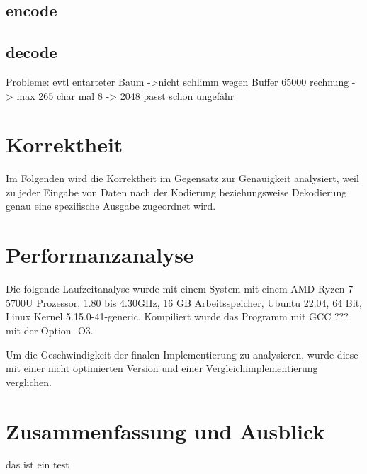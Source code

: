 \documentclass[course=erap]{aspdoc}
\begin{document}
\subsection{encode}
\subsection{decode}

Probleme: evtl entarteter Baum ->nicht schlimm wegen Buffer 65000 rechnung -> max 265 char mal 8 -> 2048 passt schon ungefähr


\section{Korrektheit}

Im Folgenden wird die Korrektheit im Gegensatz zur Genauigkeit analysiert, weil zu jeder Eingabe von Daten nach der Kodierung beziehungsweise Dekodierung genau eine spezifische Ausgabe zugeordnet wird.

\section{Performanzanalyse}

Die folgende Laufzeitanalyse wurde mit einem System mit einem AMD Ryzen 7 5700U Prozessor, 1.80 bis 4.30GHz, 16 GB Arbeitsspeicher, Ubuntu 22.04, 64 Bit, Linux Kernel 5.15.0-41-generic. Kompiliert wurde das Programm mit GCC ??? mit der Option -O3.

Um die Geschwindigkeit der finalen Implementierung zu analysieren, wurde diese mit einer nicht optimierten Version und einer Vergleichimplementierung verglichen.

\section{Zusammenfassung und Ausblick}
das ist ein test


{}
\end{document}
